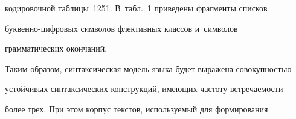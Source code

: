 



\noindent 

кодировочной таблицы~1251. В~табл.~1 приведены фрагменты списков  

бук\-вен\-но-циф\-ро\-вых символов флективных классов и~символов 

грамматических окончаний.





      

  Таким образом, синтаксическая модель языка будет выражена совокупностью 

устойчивых синтаксических конструкций, имеющих частоту встречаемости 

более трех. При этом корпус текстов, используемый для формирования 

